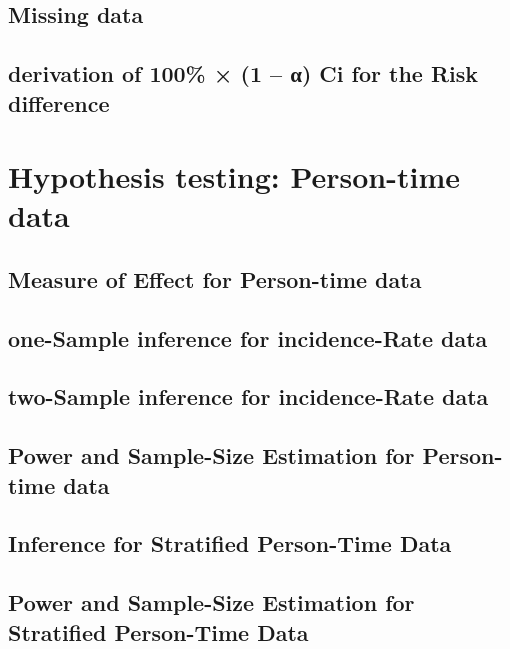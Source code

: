 \documentclass[12pt,]{article}
\theoremstyle{definition}
\theoremstyle{definition}
\theoremstyle{definition}
\theoremstyle{remark}
\begin{document}
\subsection{Missing data}\label{missing-data}

\subsection{derivation of 100\% × (1 -- α) Ci for the Risk
difference}\label{derivation-of-100-1--ci-for-the-risk-difference}

\section{Hypothesis testing: Person-time
data}\label{hypothesis-testing-person-time-data}

\subsection{Measure of Effect for Person-time
data}\label{measure-of-effect-for-person-time-data}

\subsection{one-Sample inference for incidence-Rate
data}\label{one-sample-inference-for-incidence-rate-data}

\subsection{two-Sample inference for incidence-Rate
data}\label{two-sample-inference-for-incidence-rate-data}

\subsection{Power and Sample-Size Estimation for Person-time
data}\label{power-and-sample-size-estimation-for-person-time-data}

\subsection{Inference for Stratified Person-Time
Data}\label{inference-for-stratified-person-time-data}

\subsection{Power and Sample-Size Estimation for Stratified Person-Time
Data}\label{power-and-sample-size-estimation-for-stratified-person-time-data}
\end{document}
